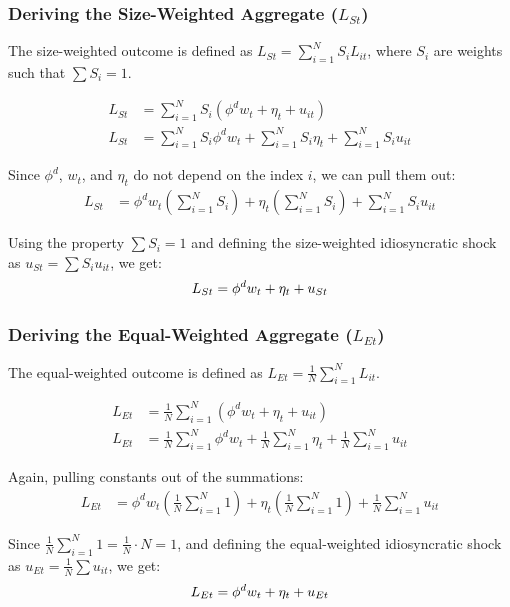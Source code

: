 \documentclass[aspectratio=169,11pt]{beamer}
\begin{document}
\begin{frame}[shrink,label=app_size_weighted]
    \frametitle{Deriving the Size-Weighted Aggregate ($L_{St}$)}
    The size-weighted outcome is defined as $L_{St} = \sum_{i=1}^N S_i L_{it}$, where $S_i$ are weights such that $\sum S_i = 1$.

    \begin{align*}
        L_{St} & = \sum_{i=1}^N S_i (\phi^d w_t + \eta_t + u_{it})                                 \\
        L_{St} & = \sum_{i=1}^N S_i \phi^d w_t + \sum_{i=1}^N S_i \eta_t + \sum_{i=1}^N S_i u_{it}
    \end{align*}

    Since $\phi^d$, $w_t$, and $\eta_t$ do not depend on the index $i$, we can pull them out:
    \begin{align*}
        L_{St} & = \phi^d w_t \left( \sum_{i=1}^N S_i \right) + \eta_t \left( \sum_{i=1}^N S_i \right) + \sum_{i=1}^N S_i u_{it}
    \end{align*}

    Using the property $\sum S_i = 1$ and defining the size-weighted idiosyncratic shock as $u_{St} = \sum S_i u_{it}$, we get:
    \begin{equation}
        L_{St} = \phi^d w_t + \eta_t + u_{St} \notag
    \end{equation}
    \vspace{0.1cm}
    \hfill \hyperlink{src_equal_weighted}{}
\end{frame}

\begin{frame}[shrink,label=app_equal_weighted]
    \frametitle{Deriving the Equal-Weighted Aggregate ($L_{Et}$)}
    The equal-weighted outcome is defined as $L_{Et} = \frac{1}{N} \sum_{i=1}^N L_{it}$.

    \begin{align*}
        L_{Et} & = \frac{1}{N} \sum_{i=1}^N (\phi^d w_t + \eta_t + u_{it})                                                 \\
        L_{Et} & = \frac{1}{N} \sum_{i=1}^N \phi^d w_t + \frac{1}{N} \sum_{i=1}^N \eta_t + \frac{1}{N} \sum_{i=1}^N u_{it}
    \end{align*}

    Again, pulling constants out of the summations:
    \begin{align*}
        L_{Et} & = \phi^d w_t \left( \frac{1}{N} \sum_{i=1}^N 1 \right) + \eta_t \left( \frac{1}{N} \sum_{i=1}^N 1 \right) + \frac{1}{N} \sum_{i=1}^N u_{it}
    \end{align*}

    Since $\frac{1}{N} \sum_{i=1}^N 1 = \frac{1}{N} \cdot N = 1$, and defining the equal-weighted idiosyncratic shock as $u_{Et} = \frac{1}{N} \sum u_{it}$, we get:
    \begin{equation}
        L_{Et} = \phi^d w_t + \eta_t + u_{Et} \notag
    \end{equation}
    \vspace{0.1cm}
    \hfill \hyperlink{src_equal_weighted}{}
\end{frame}
\end{document}
